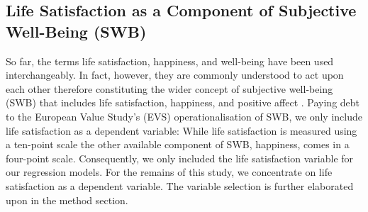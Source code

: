 \documentclass[preprint,12pt,authoryear]{elsarticle}
\begin{document}
	\subsection{Life Satisfaction as a Component of Subjective Well-Being (SWB)}
	So far, the terms life satisfaction, happiness, and well-being have been used interchangeably. In fact, however, they
	are commonly understood to act upon each other therefore constituting the wider concept of subjective well-being (SWB)
	that includes life satisfaction, happiness, and positive affect  \citep{bowling_meta-analytic_2010,diener_subjective_1984}. 
	Paying debt to the European Value Study’s (EVS) operationalisation of SWB, we only include life satisfaction as a
	dependent variable: While life satisfaction is measured using a ten-point scale the other available component of SWB,
	happiness, comes in a four-point scale. Consequently, we only included the life satisfaction variable for our regression
	models. For the remains of this study, we concentrate on life satisfaction as a dependent variable. The variable selection
	is further elaborated upon in the method section. 
	
\end{document}
